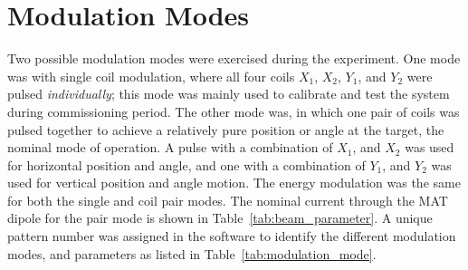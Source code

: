 \section{Modulation Modes}
\label{Modulation Modes}
Two possible modulation modes were exercised during the experiment. One mode was with single coil modulation, where all four coils $X_{1}$, $X_{2}$, $Y_{1}$, and $Y_{2}$ were pulsed \textit{individually}; this mode was mainly used to calibrate and test the system during commissioning period. The other mode was, in which one pair of coils was pulsed together to achieve a relatively pure position or angle at the target, the nominal mode of operation. A pulse with a combination of $X_{1}$, and $X_{2}$ was used for horizontal position and angle, and one with a combination of $Y_{1}$, and $Y_{2}$ was used for vertical position and angle motion. The energy modulation was the same for both the single and coil pair modes. 
The nominal current through the MAT dipole for the pair mode is shown in Table~\ref{tab:beam_parameter}. A unique pattern number was assigned in the software to identify the different modulation modes, and parameters as listed in Table~\ref{tab:modulation_mode}.

